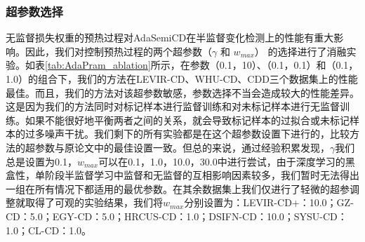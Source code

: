 \documentclass[lang=chs, degree=master, blindreview=false, adobe=false]{yanputhesis}
\begin{document}
\subsubsection{超参数选择}
无监督损失权重的预热过程对AdaSemiCD在半监督变化检测上的性能有重大影响。因此，我们对控制预热过程的两个超参数（$\gamma$ 和 $w_{max}$） 的选择进行了消融实验。如表\ref{tab:AdaPram_ablation}所示，在参数（0.1，10）、（0.1，0.1）和（0.1，1.0）的组合下，我们的方法在LEVIR-CD、WHU-CD、CDD三个数据集上的性能最佳。而且，我们的方法对该超参数敏感，参数选择不当会造成较大的性能差异。这是因为我们的方法同时对标记样本进行监督训练和对未标记样本进行无监督训练。如果不能很好地平衡两者之间的关系，就会导致标记样本的过拟合或未标记样本的过多噪声干扰。我们剩下的所有实验都是在这个超参数设置下进行的，比较方法的超参数与原论文中的最佳设置一致。但总的来说，通过经验积累发现，$\gamma$我们总是设置为0.1，$w_{max}$可以在{0.1，1.0，10.0，30.0}中进行尝试，由于深度学习的黑盒性，单阶段半监督学习中监督和无监督的互相影响因素较多，我们暂时无法得出一组在所有情况下都适用的最优参数。在其余数据集上我们仅进行了轻微的超参调整就取得了可观的实验结果，我们将$w_{max}$分别设置为：LEVIR-CD+：10.0；GZ-CD：5.0；EGY-CD：5.0；HRCUS-CD：1.0；DSIFN-CD：10.0；SYSU-CD：1.0；CL-CD：1.0。
\end{document}
